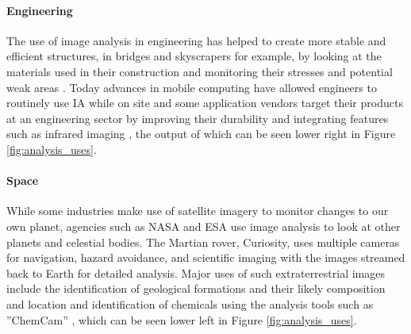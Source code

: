 		\paragraph{Engineering}
			The use of image analysis in engineering has helped to create more stable and efficient structures, in bridges and skyscrapers for example, by looking at the materials used in their construction \citep{concreteanalysis} and monitoring their stresses and potential weak areas \citep{bridgecables}. Today advances in mobile computing have allowed engineers to routinely use IA while on site and some application vendors target their products at an engineering sector by improving their durability and integrating features such as infrared imaging \citep{catphone}, the output of which can be seen lower right in Figure \ref{fig:analysis_uses}.
		\paragraph{Space}
			While some industries make use of satellite imagery to monitor changes to our own planet, agencies such as NASA and ESA use image analysis to look at other planets and celestial bodies. The Martian rover, Curiosity, uses multiple cameras for navigation, hazard avoidance, and scientific imaging with the images streamed back to Earth for detailed analysis. Major uses of such extraterrestrial images include the identification of geological formations and their likely composition \citep{curiositysand, curiositygravel} and location and identification of chemicals using the analysis tools such as ”ChemCam” \citep{curiosityhydrogen}, which can be seen lower left in Figure \ref{fig:analysis_uses}.